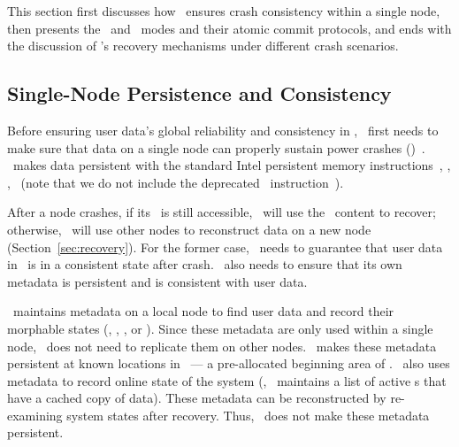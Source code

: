 This section first discusses how \hotpot\ ensures crash consistency within a single node,
then presents the \mrmw\ and \mrsw\ modes and their atomic commit protocols, %
and ends with the discussion of \hotpot's recovery mechanisms under different crash scenarios.

\subsection{Single-Node Persistence and Consistency}
\label{sec:singleconsistency}

Before ensuring user data's global reliability and consistency in \dsnvm,
\hotpot\ first needs to make sure that data on a single node can properly sustain power crashes (\rcs)~\cite{Memory-Persistency}.
\hotpot\ makes data persistent with the standard Intel persistent memory instructions~\cite{Delegated-persist},
\ie, \clflush, \mfence\ (note that we do not include the deprecated \pcommit\ instruction~\cite{Deprecating-PCOMMIT}).

After a node crashes, if its \nvm\ is still accessible, \hotpot\ will use the \nvm\ content to recover;
otherwise, \hotpot\ will use other nodes to reconstruct data on a new node (Section~\ref{sec:recovery}).
For the former case, \hotpot\ needs to guarantee that user data in \dsnvm\ is in a consistent state after crash.
\hotpot\ also needs to ensure that its own metadata is persistent and is consistent with user data.

\hotpot\ maintains metadata on a local node to find user data and record their morphable states (\ie, \committed, \dirty, or \redundant).
Since these metadata are only used within a single node, \hotpot\ does not need to replicate them on other nodes.
\hotpot\ makes these metadata persistent at known locations in \nvm\ ---
a pre-allocated beginning area of \nvm.
\hotpot\ also uses metadata to record online state of the system (\eg, \on\ maintains a list of active \dn{}s that have a cached copy of data).
These metadata can be reconstructed by re-examining system states after recovery.
Thus, \hotpot\ does not make these metadata persistent.



